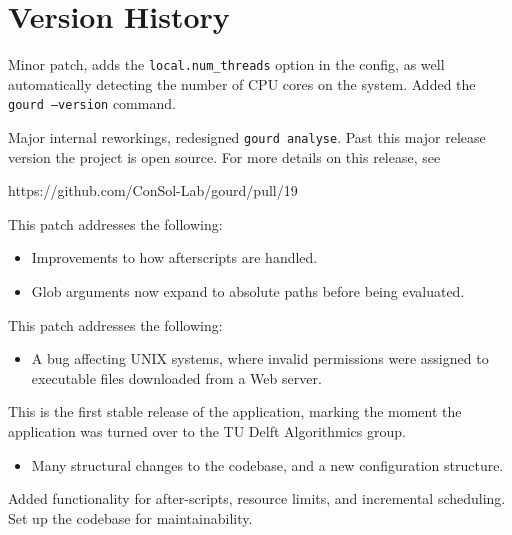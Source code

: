 \pagebreak

\section{Version History}



Minor patch, adds the \texttt{local.num\_threads} option in 
the config, as well automatically detecting the number of CPU
cores on the system. Added the \texttt{gourd --version} command.


Major internal reworkings, redesigned \texttt{gourd analyse}.
Past this major release version the project is open source.
For more details on this release, see 

https://github.com/ConSol-Lab/gourd/pull/19


This patch addresses the following:
\begin{itemize}
\item Improvements to how afterscripts are handled.
\item Glob arguments now expand to absolute paths
      before being evaluated.
\end{itemize}


This patch addresses the following:
\begin{itemize}
\item A bug affecting UNIX systems, where invalid
      permissions were assigned to executable files
      downloaded from a Web server.
\end{itemize}


This is the first stable release of the application,
marking the moment the application was turned over
to the TU Delft Algorithmics group.

\breakingchanges
\begin{itemize}
\item Many structural changes to the codebase, and a
  new configuration structure.
\end{itemize}


Added functionality for after-scripts, resource limits,
and incremental scheduling.
Set up the codebase for maintainability.

